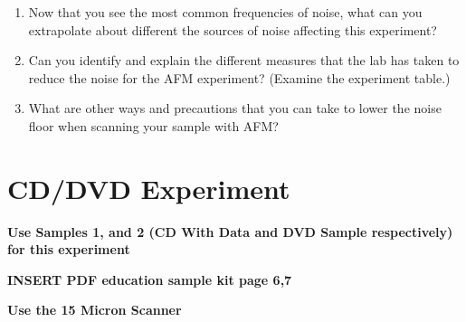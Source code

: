 \documentclass{../lab}
\begin{document}
\begin{enumerate}
\begin{itemize}
    \end{itemize}

    \item Now that you see the most common frequencies of noise, what can you extrapolate about different the sources of noise affecting this experiment?

    \item Can you identify and explain the different measures that the lab has taken to reduce the noise for the AFM experiment? (Examine the experiment table.)

    \item What are other ways and precautions that you can take to lower the noise floor when scanning your sample with AFM?

\end{enumerate}

\section{CD/DVD Experiment}

\textbf{Use Samples 1, and 2 (CD With Data and DVD Sample respectively) for this experiment}

\textbf{​INSERT PDF education sample kit page 6,7}

\textbf{Use the 15 Micron Scanner }
\end{document}
